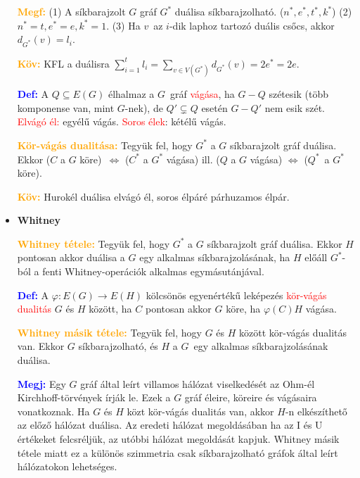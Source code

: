 \documentclass[../../szobeli.tex]{subfiles}
\begin{document}
\begin{itemize}
        \textcolor{orange}{\textbf{Megf:}} (1) A síkbarajzolt $G$ gráf $G^*$ duálisa síkbarajzolható. ($n^*, e^*, t^*, k^*$) (2) $n^* = t, e^* = e, k^* = 1$. (3) Ha $v$ az $i$-dik laphoz tartozó duális csőcs, akkor $d_{G^*}(v) = l_i$.

        \textcolor{orange}{\textbf{Köv:}} KFL a duálisra $\sum_{i = 1}^{t} l_i = \sum_{v \in V(G^*)}d_{G^*}(v) = 2e^* = 2e$.

        \textcolor{blue}{\textbf{Def:}} A $Q \subseteq E(G)$ élhalmaz a $G$ gráf \textcolor{red}{vágása}, ha $G - Q$ szétesik (több komponense van, mint $G$-nek), de $Q' \subsetneq Q$ esetén $G - Q'$ nem esik szét. \textcolor{red}{Elvágó él:} egyélű vágás. \textcolor{red}{Soros élek}: kétélű vágás.

        \textcolor{orange}{\textbf{Kör-vágás dualitása:}} Tegyük fel, hogy $G^*$ a $G$ síkbarajzolt gráf duálisa. Ekkor ($C$ a $G$ köre) $\Longleftrightarrow$ ($C^*$ a $G^*$ vágása) ill. ($Q$ a $G$ vágása) $\Longleftrightarrow$ ($Q^*$ a $G^*$ köre). 

        \textcolor{orange}{\textbf{Köv:}} Hurokél duálisa elvágó él, soros élpáré párhuzamos élpár.

    \item \textbf{Whitney} 

        \textcolor{orange}{\textbf{Whitney tétele:}} Tegyük fel, hogy $G^*$ a $G$ síkbarajzolt gráf duálisa. Ekkor $H$ pontosan akkor duálisa a $G$ egy alkalmas síkbarajzolásának, ha $H$ előáll $G^*$-ból a fenti Whitney-operációk alkalmas egymásutánjával.

        \textcolor{blue}{\textbf{Def:}} A $\varphi : E(G) \rightarrow E(H)$ kölcsönös egyenértékű leképezés \textcolor{red}{kör-vágás dualitás} $G$ és $H$ között, ha $C$ pontosan akkor $G$ köre, ha $\varphi(C) H$ vágása.

        \textcolor{orange}{\textbf{Whitney másik tétele:}} Tegyük fel, hogy $G$ és $H$ között kör-vágás dualitás van. Ekkor $G$ síkbarajzolható, és $H$ a $G$ egy alkalmas síkbarajzolásának duálisa.
        
        \textcolor{blue}{\textbf{Megj:}} Egy $G$ gráf által leírt villamos hálózat viselkedését az Ohm-él Kirchhoff-törvények írják le. Ezek a $G$ gráf éleire, köreire és vágásaira vonatkoznak. Ha $G$ és $H$ közt kör-vágás dualitás van, akkor $H$-n elkészíthető az előző hálózat duálisa. Az eredeti hálózat megoldásában ha az I és U értékeket felcsréljük, az utóbbi hálózat megoldását kapjuk. Whitney másik tétele miatt ez a különös szimmetria csak síkbarajzolható gráfok által leírt hálózatokon lehetséges.

    \end{itemize}
\end{document}
